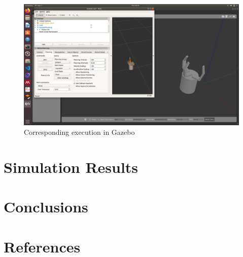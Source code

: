 \documentclass[a4paper,12pt,one side]{report}%
\begin{document}
\begin{figure}[!h]
\centering
\includegraphics[scale=.2]{gripper_images/corresp_execution_in_gazebo.png}
\caption{Corresponding execution in Gazebo}
\label{joint_state_pub}
\end{figure}


















\chapter{Simulation Results} 


\chapter{Conclusions} 


\chapter{References}
\end{document}
